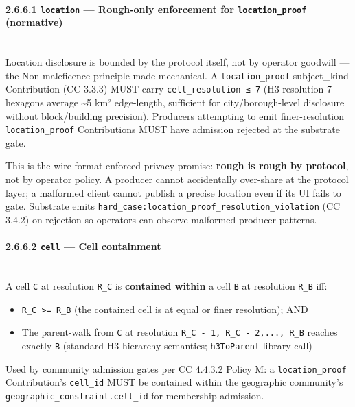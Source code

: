 \documentclass[11pt]{article}
\begin{document}
\paragraph{2.6.6.1 \texttt{location} — Rough-only enforcement for \texttt{location\_proof} (normative)}\mbox{}\\


Location disclosure is bounded by the protocol itself, not by operator goodwill — the Non-maleficence principle made mechanical. A \texttt{location\_proof} subject\_kind Contribution (CC 3.3.3) MUST carry \texttt{cell\_resolution ≤ 7} (H3 resolution 7 hexagons average \textasciitilde{}5 km² edge-length, sufficient for city/borough-level disclosure without block/building precision). Producers attempting to emit finer-resolution \texttt{location\_proof} Contributions MUST have admission rejected at the substrate gate.


This is the wire-format-enforced privacy promise: \textbf{rough is rough by protocol}, not by operator policy. A producer cannot accidentally over-share at the protocol layer; a malformed client cannot publish a precise location even if its UI fails to gate. Substrate emits \texttt{hard\_case:location\_proof\_resolution\_violation} (CC 3.4.2) on rejection so operators can observe malformed-producer patterns.


\paragraph{2.6.6.2 \texttt{cell} — Cell containment}\mbox{}\\


A cell \texttt{C} at resolution \texttt{R\_C} is \textbf{contained within} a cell \texttt{B} at resolution \texttt{R\_B} iff:


\begin{itemize}\setlength\itemsep{0pt}
\item \texttt{R\_C >= R\_B} (the contained cell is at equal or finer resolution); AND
\item The parent-walk from \texttt{C} at resolution \texttt{R\_C - 1, R\_C - 2,..., R\_B} reaches exactly \texttt{B} (standard H3 hierarchy semantics; \texttt{h3ToParent} library call)
\end{itemize}


Used by community admission gates per CC 4.4.3.2 Policy M: a \texttt{location\_proof} Contribution's \texttt{cell\_id} MUST be contained within the geographic community's \texttt{geographic\_constraint.cell\_id} for membership admission.
\end{document}
